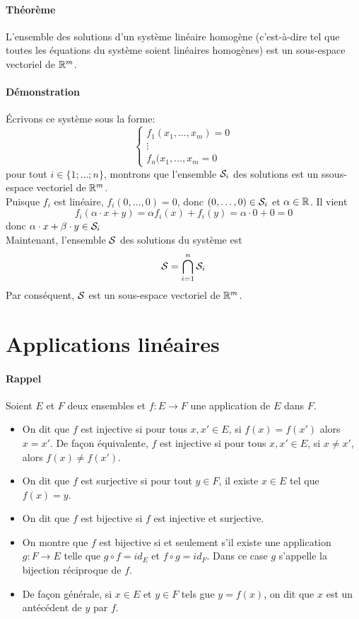 \paragraph{Théorème} L'ensemble des solutions d'un système linéaire homogène (c'est-à-dire tel que toutes les équations du système soient linéaires homogènes) est un sous-espace vectoriel de $\mathbb{R}^m$.
\paragraph{Démonstration} Écrivons ce système sous la forme:
$$ \left\{ \begin{matrix}
  f_1(x_1, \ldots, x_m) = 0\\
  \vdots \\
  f_n(x_1, \ldots, x_m = 0
\end{matrix}$$
pour tout $i \in \{1; \ldots; n\}$, montrons que l'ensemble $\mathcal{S}_i$ des solutions est un ssous-espace vectoriel de $\mathbb{R}^m$. \\
Puisque $f_i$ est linéaire, $f_i(0, \ldots, 0) = 0$, donc $(0,  \ldots, 0) \in \mathcal{S}_i$ et $\alpha \in \mathbb{R}$. Il vient 
$$f_i(\alpha \cdot x + y) = \alpha f_i(x) + f_i(y) = \alpha \cdot 0 
+ 0 = 0$$
donc $\alpha \cdot x + \beta \cdot y \in \mathcal{S}_i$ \\
Maintenant, l'ensemble $\mathcal{S}$ des solutions du système est 
$$\mathcal{S} =  \bigcap_{i=1}^n {\mathcal{S}_i}$$
Par conséquent, $\mathcal{S}$ est un sous-espace vectoriel de $\mathbb{R}^m$.

%
%
\section{Applications linéaires}
%
%
\paragraph{Rappel} Soient $E$ et $F$ deux ensembles et $f: E \rightarrow F$ une application de $E$ dans $F$.
\begin{itemize}
 \item On dit que $f$ est injective si pour tous $x, x' \in E$, si $f(x) = f(x')$ alors $x=x'$. De façon équivalente, $f$ est injective si pour tous $x, x' \in E$, si $x \neq x'$, alors $f(x) \neq f(x')$.
  \item On dit que $f$ est surjective si pour tout $y \in F$, il existe $x \in E$ tel que $f(x) = y$. 
  \item On dit que $f$ est bijective si $f$ est injective et surjective.
  \item On montre que $f$ est bijective si et seulement s'il existe une application $g: F \rightarrow E$ telle que $g \circ f = id_E$ et $f \circ g = id_F$. Dans ce case $g$ s'appelle la bijection réciproque de $f$.
  \item De façon générale, si $x \in E$ et $y \in F$ tels gue $y = f(x)$, on dit que $x$ est un antécédent de $y$ par $f$.
\end{itemize}

